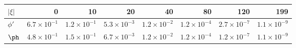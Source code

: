 \begin{tabular}{@{}lrrrrrrr@{}}
\toprule
$|\xi|$ & 0 & 10 & 20 & 40 & 80 & 120 & 199\\
\midrule
$\phi'$ & $6.7\times10^{-1}$ & $1.2\times10^{-1}$ & $5.3\times10^{-3}$ & $1.2\times10^{-2}$ & $1.2\times10^{-4}$ & $2.7\times10^{-7}$ & $1.1\times10^{-9}$\\
$\ph$ & $4.8\times10^{-1}$ & $1.5\times10^{-1}$ & $6.7\times10^{-3}$ & $1.2\times10^{-2}$ & $1.2\times10^{-4}$ & $1.2\times10^{-7}$ & $1.1\times10^{-9}$\\
\bottomrule
\end{tabular}
